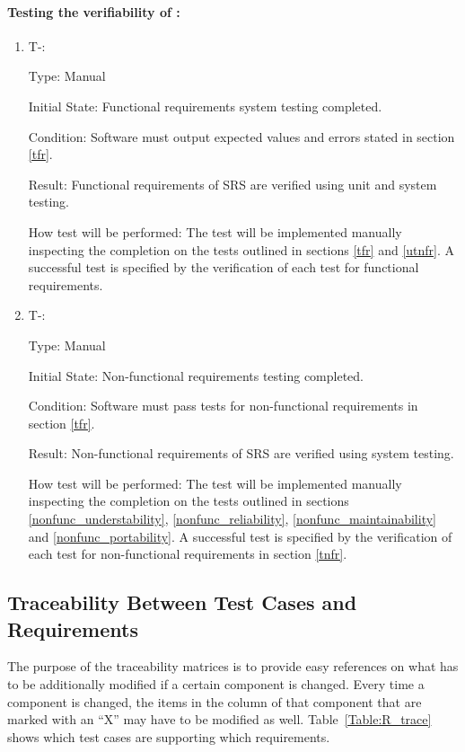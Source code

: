 \documentclass[12pt, titlepage]{article}
\newcounter{tinnum} %
\begin{document}
\paragraph{Testing the verifiability of \progname{}:}
\begin{enumerate}

\item{T-}\thetinnum\label{T-13}:

Type: Manual 
					
Initial State: Functional requirements system testing completed.
					
Condition: Software must output expected values and errors stated in section 
\ref{tfr}.
					
Result: Functional requirements of SRS are verified using unit and system testing.
					
How test will be performed: The test will be implemented manually inspecting the 
completion on the tests outlined in sections \ref{tfr} and \ref{utnfr}. A successful test is specified by the verification of each test for functional requirements.
					
\item{T-}\thetinnum\label{T-14}:

Type: Manual 
					
Initial State: Non-functional requirements testing completed.
					
Condition: Software must pass tests for non-functional requirements in section 
\ref{tfr}. 
					
Result: Non-functional requirements of SRS are verified using system testing.
					
How test will be performed: The test will be implemented manually inspecting the 
completion on the tests outlined in sections \ref{nonfunc_understability}, 
\ref{nonfunc_reliability},  \ref{nonfunc_maintainability} and 
\ref{nonfunc_portability}. A successful test is specified by the verification of each test for non-functional requirements in section \ref{tnfr}.
					

\end{enumerate}



\subsection{Traceability Between Test Cases and Requirements}

The purpose of the traceability matrices is to provide easy references on what
has to be additionally modified if a certain component is changed.  Every time a
component is changed, the items in the column of that component that are marked
with an ``X'' may have to be modified as well.  Table~\ref{Table:R_trace} shows 
which test cases are supporting which requirements.
\end{document}
